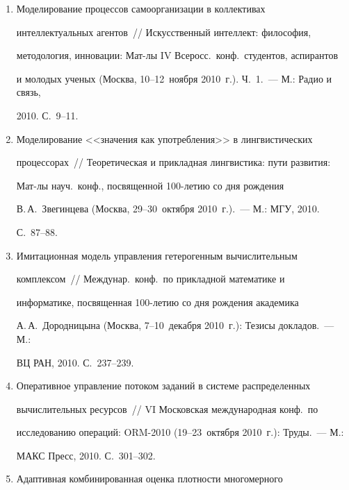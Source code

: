 \begin{enumerate}[1.]
\item {}


Моделирование процессов самоорганизации в коллективах 


интеллектуальных агентов~/\!\!/  Искусственный интеллект: философия, 


методология, инновации: Мат-лы IV Всеросс.\  конф.\ студентов, аспирантов 


и молодых ученых (Москва, 10--12~ноября 2010~г.). Ч.~1.~--- М.: Радио и связь, 


2010. С.~9--11.


\item {}


Моделирование <<значения как употребления>> в лингвистических 


процессорах~/\!\!/  Теоретическая и прикладная лингвистика: пути развития: 


Мат-лы науч.\ конф., посвященной 100-летию со дня рождения 


В.\,А.~Звегинцева (Москва, 29--30~октября 2010~г.).~--- М.: МГУ, 2010. 


С.~87--88.


\item {}


Имитационная модель управления гетерогенным вычислительным 


комплексом~/\!\!/  Междунар.\ конф.\ по прикладной математике и 


информатике, посвященная 100-ле\-тию со дня рождения академика 


А.\,А.~Дородницына (Москва, 7--10~декабря 2010~г.): Тезисы докладов.~--- М.: 


ВЦ РАН, 2010. С.~237--239.


\item {}


Оперативное управ\-ле\-ние потоком заданий в сис\-те\-ме распределенных 


вычислительных ресурсов~/\!\!/  VI Московская международная конф.\ по 


исследованию операций: ORM-2010 (19--23~октября 2010~г.): Труды.~--- М.: 


МАКС Пресс, 2010. С.~301--302.


\item {}


Адаптивная комбинированная оценка плотности многомерного 



\end{enumerate}
